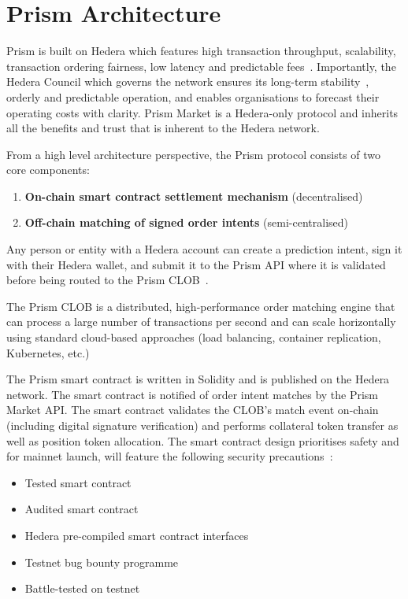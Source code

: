 \documentclass[11pt,a4paper]{article}
\begin{document}
\section{Prism Architecture}

Prism is built on Hedera which features high transaction throughput, scalability, transaction ordering fairness, low latency and predictable fees~\cite{hedera_whitepaper}\cite{szabo1997}. Importantly, the Hedera Council which governs the network ensures its long-term stability~\cite{hedera_whitepaper}, orderly and predictable operation, and enables organisations to forecast their operating costs with clarity. Prism Market is a Hedera-only protocol and inherits all the benefits and trust that is inherent to the Hedera network. 

From a high level architecture perspective, the Prism protocol consists of two core components:

\begin{enumerate}[leftmargin=1.33em]
    \item \textbf{On-chain smart contract settlement mechanism} (decentralised)
    \item \textbf{Off-chain matching of signed order intents} (semi-centralised)
\end{enumerate}

Any person or entity with a Hedera account can create a prediction intent, sign it with their Hedera wallet, and submit it to the Prism API where it is validated before being routed to the Prism CLOB~\cite{kreps2011}.

The Prism CLOB is a distributed, high-performance order matching engine that can process a large number of transactions per second and can scale horizontally using standard cloud-based approaches (load balancing, container replication, Kubernetes, etc.)

The Prism smart contract is written in Solidity and is published on the Hedera network. The smart contract is notified of order intent matches by the Prism Market API. The smart contract validates the CLOB's match event on-chain (including digital signature verification) and performs collateral token transfer as well as position token allocation. The smart contract design prioritises safety and for mainnet launch, will feature the following security precautions~\cite{nasdaq2019}:

\begin{itemize}[leftmargin=2em]
    \item Tested smart contract
    \item Audited smart contract
    \item Hedera pre-compiled smart contract interfaces
    \item Testnet bug bounty programme
    \item Battle-tested on testnet
\end{itemize}
\end{document}
